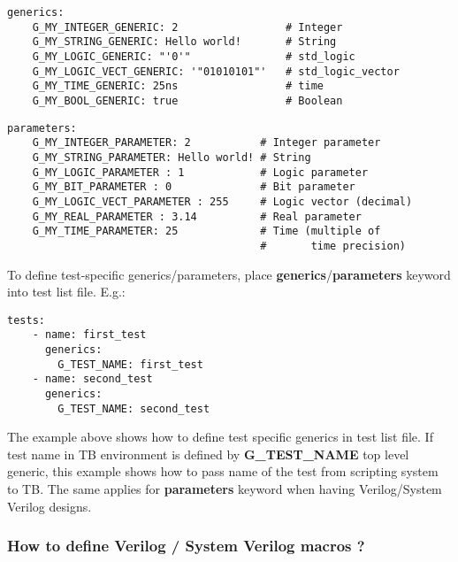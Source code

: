 \documentclass{tropic_design_spec}
\begin{document}
\begin{lstlisting}
generics:
    G_MY_INTEGER_GENERIC: 2                 # Integer
    G_MY_STRING_GENERIC: Hello world!       # String
    G_MY_LOGIC_GENERIC: "'0'"               # std_logic
    G_MY_LOGIC_VECT_GENERIC: '"01010101"'   # std_logic_vector
    G_MY_TIME_GENERIC: 25ns                 # time
    G_MY_BOOL_GENERIC: true                 # Boolean
\end{lstlisting}

\begin{lstlisting}
parameters:
    G_MY_INTEGER_PARAMETER: 2           # Integer parameter
    G_MY_STRING_PARAMETER: Hello world! # String
    G_MY_LOGIC_PARAMETER : 1            # Logic parameter
    G_MY_BIT_PARAMETER : 0              # Bit parameter
    G_MY_LOGIC_VECT_PARAMETER : 255     # Logic vector (decimal)
    G_MY_REAL_PARAMETER : 3.14          # Real parameter
    G_MY_TIME_PARAMETER: 25             # Time (multiple of
                                        #       time precision)
\end{lstlisting}

\vspace{0.5cm}

To define test-specific generics/parameters, place \textbf{generics}/\textbf{parameters} keyword
into test  list file. E.g.:

\begin{lstlisting}
tests:
    - name: first_test
      generics:
        G_TEST_NAME: first_test
    - name: second_test
      generics:
        G_TEST_NAME: second_test
\end{lstlisting}

The example above shows how to define test specific generics in test list file. If
test name in TB environment is defined by \textbf{G_TEST_NAME} top level generic,
this example shows how to pass name of the test from scripting system to TB. The
same applies for \textbf{parameters} keyword when having Verilog/System Verilog designs.



\subsubsection{How to define Verilog / System Verilog macros ?}
\label{sec:how-to-define-verilog-system-verilog-macros}
\end{document}
